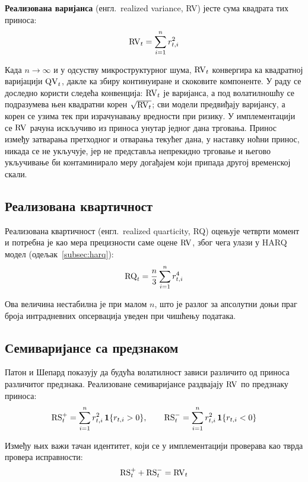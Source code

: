 \textbf{Реализована варијанса} (енгл.\ realized variance, RV) јесте сума квадрата тих
приноса:
\begin{equation}
\mathrm{RV}_t = \sum_{i=1}^{n} r_{t,i}^{2}
\end{equation}

Када $n \to \infty$ и у одсуству микроструктурног шума, $\mathrm{RV}_t$ конвергира ка
квадратној варијацији $\mathrm{QV}_t$, дакле ка збиру континуиране и скоковите компоненте.
У раду се доследно користи следећа конвенција: $\mathrm{RV}_t$ је варијанса, а под
волатилношћу се подразумева њен квадратни корен $\sqrt{\mathrm{RV}_t}$; сви модели
предвиђају варијансу, а корен се узима тек при израчунавању вредности при ризику.
У имплементацији се $\mathrm{RV}$ рачуна искључиво из приноса унутар једног дана трговања.
Принос између затварања претходног и отварања текућег дана, у наставку ноћни принос,
никада се не укључује, јер не представља непрекидно трговање и његово укључивање би
контаминирало меру догађајем који припада другој временској скали.

\subsection{Реализована квартичност}

Реализована квартичност (енгл.\ realized quarticity, RQ) оцењује четврти момент и
потребна је као мера прецизности
саме оцене $\mathrm{RV}$, због чега улази у HARQ модел (одељак~\ref{subsec:harq}):
\begin{equation}
\mathrm{RQ}_t = \frac{n}{3}\sum_{i=1}^{n} r_{t,i}^{4}
\end{equation}

Ова величина нестабилна је при малом $n$, што је разлог за апсолутни доњи праг броја
интрадневних опсервација уведен при чишћењу података.

\subsection{Семиваријансе са предзнаком}

Патон и Шепард \parencite{pattonSheppard2015} показују да будућа волатилност зависи
различито од приноса различитог предзнака. Реализоване семиваријансе раздвајају
$\mathrm{RV}$ по предзнаку приноса:
\begin{equation}
\mathrm{RS}_t^{+} = \sum_{i=1}^{n} r_{t,i}^{2}\,\mathbf{1}\{r_{t,i} > 0\},
\qquad
\mathrm{RS}_t^{-} = \sum_{i=1}^{n} r_{t,i}^{2}\,\mathbf{1}\{r_{t,i} < 0\}
\end{equation}

Између њих важи тачан идентитет, који се у имплементацији проверава као тврда
провера исправности:
\begin{equation}
\mathrm{RS}_t^{+} + \mathrm{RS}_t^{-} = \mathrm{RV}_t
\label{eq:semivar-identity}
\end{equation}

